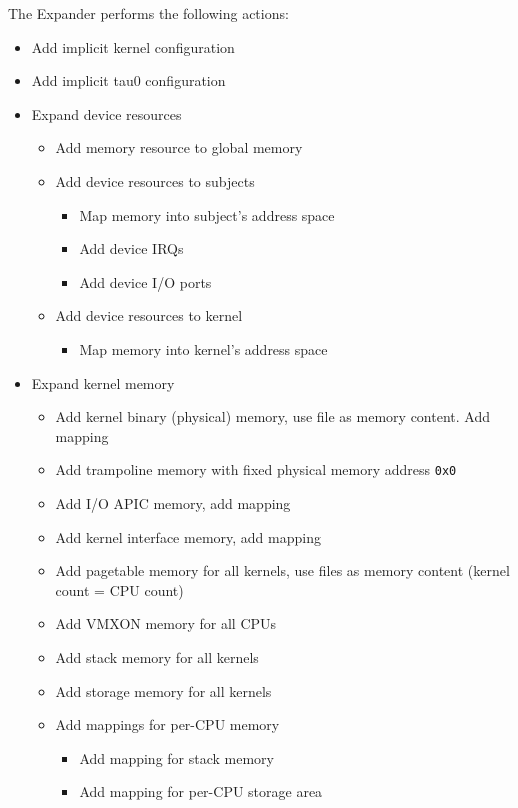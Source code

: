 \documentclass[a4paper,twoside,titlepage]{article}
\begin{document}
The Expander performs the following actions:
\begin{itemize}
	\item Add implicit kernel configuration
	\item Add implicit tau0 configuration
	\item Expand device resources
		\begin{itemize}
			\item Add memory resource to global memory
			\item Add device resources to subjects
				\begin{itemize}
					\item Map memory into subject's address space
					\item Add device IRQs
					\item Add device I/O ports
				\end{itemize}
			\item Add device resources to kernel
				\begin{itemize}
					\item Map memory into kernel's address space
				\end{itemize}
		\end{itemize}
	\item Expand kernel memory
		\begin{itemize}
			\item Add kernel binary (physical) memory, use file as memory
				content. Add mapping
			\item Add trampoline memory with fixed physical memory address
				\texttt{0x0}
			\item Add I/O APIC memory, add mapping
			\item Add kernel interface memory, add mapping
			\item Add pagetable memory for all kernels, use files as memory
				content (kernel count = CPU count)
			\item Add VMXON memory for all CPUs
			\item Add stack memory for all kernels
			\item Add storage memory for all kernels
			\item Add mappings for per-CPU memory
				\begin{itemize}
					\item Add mapping for stack memory
					\item Add mapping for per-CPU storage area
				\end{itemize}
		\end{itemize}

\end{itemize}
\end{document}
